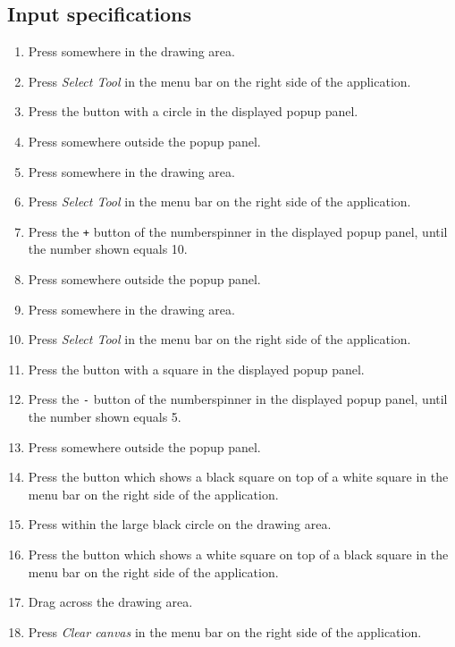 \subsection*{Input specifications}
\begin{enumerate}
\item Press somewhere in the drawing area.
\item Press \emph{Select Tool} in the menu bar on the right side of the application.
\item Press the button with a circle in the displayed popup panel.
\item Press somewhere outside the popup panel.
\item Press somewhere in the drawing area.

\item Press \emph{Select Tool} in the menu bar on the right side of the application.
\item Press the \texttt{+} button of the numberspinner in the displayed popup panel, until the number shown equals 10.
\item Press somewhere outside the popup panel.
\item Press somewhere in the drawing area.
\item Press \emph{Select Tool} in the menu bar on the right side of the application. 

\item Press the button with a square in the displayed popup panel.
\item Press the \texttt{-} button of the numberspinner in the displayed popup panel, until the number shown equals 5.
\item Press somewhere outside the popup panel.
\item Press the button which shows a black square on top of a white square in the menu bar on the right side of the application. 
\item Press within the large black circle on the drawing area.

\item Press the button which shows a white square on top of a black square in the menu bar on the right side of the application. 
\item Drag across the drawing area.
\item Press \emph{Clear canvas} in the menu bar on the right side of the application. 
\end{enumerate}

